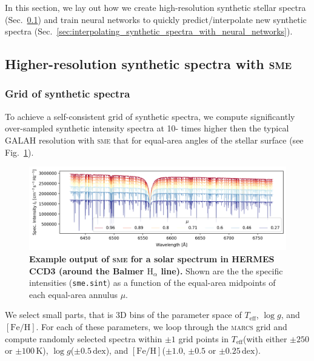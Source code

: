 \documentclass[
  journal=pasa,
  manuscript=research-paper, %
  year=2023,
  volume=37
]{cup-journal}
\newcommand{\Teff}{$T_\mathrm{eff}$\xspace}
\newcommand{\logg}{$\log g$\xspace}
\newcommand{\feh}{$\mathrm{[Fe/H]}$\xspace}
\newcommand{\sme}{\textsc{sme}\xspace}
\newcommand{\marcs}{\textsc{marcs}\xspace}
\newcommand{\dex}{\,\mathrm{dex}}	%
\newcommand{\K}{\,\mathrm{K}}	%
\begin{document}
In this section, we lay out how we create high-resolution synthetic stellar spectra (Sec.~\ref{sec:higher_resolution_synthetic_spectra}) and train neural networks to quickly predict/interpolate new synthetic spectra (Sec.~\ref{sec:interpolating_synthetic_spectra_with_neural_networks}).

\subsection{Higher-resolution synthetic spectra with \sme}
\label{sec:higher_resolution_synthetic_spectra}

\subsubsection{Grid of synthetic spectra} \label{subsubsec:spectrum_grid}

To achieve a self-consistent grid of synthetic spectra, we compute significantly over-sampled synthetic intensity spectra at 10- times higher then the typical GALAH resolution with \sme that for equal-area angles of the stellar surface (see Fig.~\ref{fig:sme_mu_output}).

\begin{figure}[hbt]
 \centering
 \includegraphics[width=\textwidth]{figures/solar_twin_specific_intensity.png}
 \caption{\textbf{Example output of \sme for a solar spectrum in HERMES CCD3 (around the Balmer $\mathrm{H}_\alpha$ line).} Shown are the the specific intensities (\texttt{sme.sint}) as a function of the equal-area midpoints of each equal-area annulus $\mu$.}
 \label{fig:sme_mu_output}
\end{figure}

We select small parts, that is 3D bins of the parameter space of \Teff, \logg, and \feh. For each of these parameters, we loop through the \marcs grid and compute randomly selected spectra within $\pm 1$ grid points in \Teff (with either $\pm 250$ or $\pm 100\K$), \logg ($\pm 0.5\dex$), and \feh ($\pm 1.0$, $\pm 0.5$ or $\pm 0.25\dex $).
\end{document}
